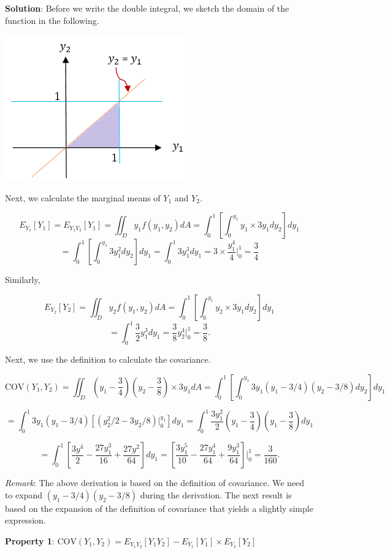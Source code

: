 \documentclass[
]{book}
\begin{document}
\textbf{Solution}: Before we write the double integral, we sketch the domain of the function in the following.

\begin{center}\includegraphics[width=0.4\linewidth]{topic08/example03COV} \end{center}

Next, we calculate the marginal means of \(Y_1\) and \(Y_2\).

\[
E_{Y_1}[Y_1] = E_{Y_1Y_2}[Y_1] = \iint_D y_1f(y_1,y_2)dA = \int_0^1\left[\int_0^{y_1}y_1\times 3y_1 dy_2\right]  dy_1
\]
\[
= \int_0^1\left[\int_0^{y_1} 3y_1^2 dy_2\right]  dy_1 =\int_0^1 3y_1^3dy_1 = 3\times \frac{y_1^4}{4}\Bigg|_0^1 = \frac{3}{4}
\]

Similarly,

\[
E_{Y_2}[Y_2] = \iint_Dy_2f(y_1,y_2)dA = \int_0^1 \left[\int_0^{y_1} y_2\times 3y_1 dy_2 \right] dy_1
\]
\[
=\int_0^1 \frac{3}{2}y_1^3dy_1 = \frac{3}{8} y_2^4\Bigg|_0^1 = \frac{3}{8}.
\]

Next, we use the definition to calculate the covariance.

\[
\text{COV}(Y_1, Y_2) = \iint_D(y_1-\frac{3}{4})(y_2-\frac{3}{8}) \times 3y_1 dA = \int_0^1\left[\int_0^{y_1}3y_1(y_1-3/4) (y_2-3/8 )dy_2 \right]  dy_1
\]

\[
=\int_0^1 3y_1(y_1-3/4)\left[ (y_2^2/2-3y_2/8)\Big|_0^{y_1}  \right]dy_1 = \int_0^1 \frac{3y_1^2}{2}(y_1-\frac{3}{4})(y_1-\frac{3}{8})dy_1
\]

\[
= \int_0^1\left[\frac{3y^4}{2} -\frac{27y_1^3}{16} + \frac{27y^2}{64}\right]dy_1 = \left[\frac{3y_1^5}{10} - \frac{27y_1^4}{64} + \frac{9y_1^3}{64}\right]\Bigg|_0^1 = \frac{3}{160}.
\]

\emph{Remark}: The above derivation is based on the definition of covariance. We need to expand \((y_1-3/4)(y_2-3/8)\) during the derivation. The next result is based on the expansion of the definition of covariance that yields a slightly simple expression.

\textbf{Property 1}: \(\text{COV}(Y_1, Y_2) = E_{Y_1Y_2}[Y_1Y_2] - E_{Y_1}[Y_1]\times E_{Y_2}[Y_2]\)
\end{document}
